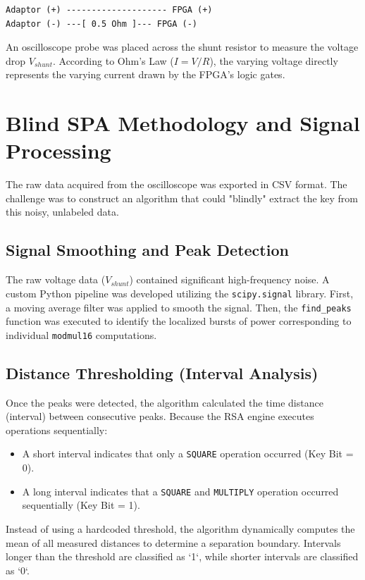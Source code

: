 \documentclass[conference, a4paper]{IEEEtran}
\begin{document}
\begin{verbatim}
Adaptor (+) -------------------- FPGA (+)
Adaptor (-) ---[ 0.5 Ohm ]--- FPGA (-)
\end{verbatim}

An oscilloscope probe was placed across the shunt resistor to measure the voltage drop $V_{shunt}$. According to Ohm's Law ($I = V/R$), the varying voltage directly represents the varying current drawn by the FPGA's logic gates.

\section{Blind SPA Methodology and Signal Processing}

The raw data acquired from the oscilloscope was exported in CSV format. The challenge was to construct an algorithm that could "blindly" extract the key from this noisy, unlabeled data. 

\subsection{Signal Smoothing and Peak Detection}
The raw voltage data ($V_{shunt}$) contained significant high-frequency noise. A custom Python pipeline was developed utilizing the \texttt{scipy.signal} library. First, a moving average filter was applied to smooth the signal. Then, the \texttt{find\_peaks} function was executed to identify the localized bursts of power corresponding to individual \texttt{modmul16} computations.

\subsection{Distance Thresholding (Interval Analysis)}
Once the peaks were detected, the algorithm calculated the time distance (interval) between consecutive peaks. Because the RSA engine executes operations sequentially:
\begin{itemize}
    \item A short interval indicates that only a \texttt{SQUARE} operation occurred (Key Bit = 0).
    \item A long interval indicates that a \texttt{SQUARE} and \texttt{MULTIPLY} operation occurred sequentially (Key Bit = 1).
\end{itemize}

Instead of using a hardcoded threshold, the algorithm dynamically computes the mean of all measured distances to determine a separation boundary. Intervals longer than the threshold are classified as `1`, while shorter intervals are classified as `0`.
\end{document}
